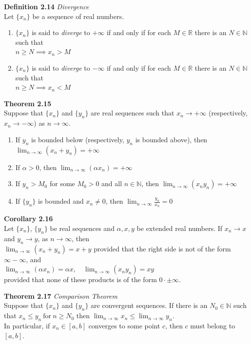 \documentclass[8pt,landscape]{article}
\begin{document}
\begin{multicols}{3}
    \textbf{Definition 2.14} \emph{Divergence} \\
    Let $\{x_n\}$ be a sequence of real numbers.
    \begin{enumerate}
        \item $\{x_n\}$ is said to \emph{diverge} to $+\infty$ if and only if for each
            $M \in \mathbb{R}$ there is an $N \in \mathbb{N}$ such that \\
            $n \geq N \implies x_n > M$
        \item $\{x_n\}$ is said to \emph{diverge} to $-\infty$ if and only if for each
            $M \in \mathbb{R}$ there is an $N \in \mathbb{N}$ such that \\
            $n \geq N \implies x_n < M$
    \end{enumerate}

    \textbf{Theorem 2.15} \\
    Suppose that $\{x_n\}$ and $\{y_n\}$ are real sequences such that $x_n \to +\infty$
    (respectively, $x_n \to -\infty$) as $n \to \infty$.
    \begin{enumerate}
        \item If $y_n$ is bounded below (respectively, $y_n$ is bounded above), then
            $\lim_{n \to \infty} (x_n + y_n) = +\infty$
        \item If $\alpha > 0$, then
            $\lim_{n \to \infty} (\alpha x_n) = +\infty$
        \item If $y_n > M_0$ for some $M_0 > 0$ and all $n \in \mathbb{N}$, then
            $\lim_{n \to \infty} (x_n y_n) = +\infty$
        \item If $\{y_n\}$ is bounded and $x_n \neq 0$, then
            $\lim_{n \to \infty} \frac{y_n}{x_n} = 0$
    \end{enumerate}

    \textbf{Corollary 2.16} \\
    Let $\{x_n\}$, $\{y_n\}$ be real sequences and $\alpha, x, y$ be extended real numbers.
    If $x_n \to x$ and $y_n \to y$, as $n \to \infty$, then \\
    $\lim_{n \to \infty} (x_n + y_n) = x + y$
    provided that the right side is not of the form $\infty - \infty$, and \\
    $\lim_{n \to \infty} (\alpha x_n) = \alpha x, \quad
    \lim_{n \to \infty} (x_n y_n) = xy$ \\
    provided that none of these products is of the form $0 \cdot \pm \infty$.

    \textbf{Theorem 2.17} \emph{Comparison Theorem} \\
    Suppose that $\{x_n\}$ and $\{y_n\}$ are convergent sequences.
    If there is an $N_0 \in \mathbb{N}$ such that
    $x_n \leq y_n \ \text{for} \ n \geq N_0$
    then
    $\lim_{n \to \infty} x_n \leq \lim_{n \to \infty} y_n$. \\
    In particular, if $x_n \in [a, b]$ converges to some point $c$,
    then $c$ must belong to $[a, b]$.



\end{multicols}
\end{document}
